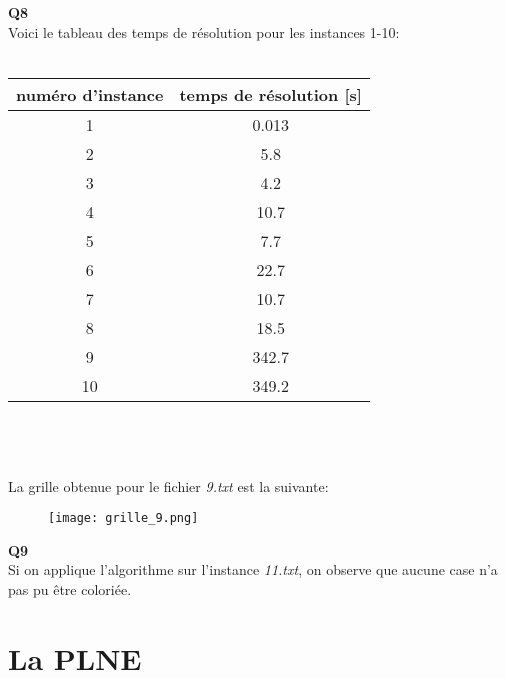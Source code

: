 \documentclass[10pt,a4paper]{article}
\begin{document}
\noindent 
\textbf{Q8}
\\
\noindent
Voici le tableau des temps de résolution pour les instances 1-10: \\ \\
\begin{tabular}{|c|c|}
\hline
numéro d'instance & temps de résolution [s]\\
\hline
\hline
1  & 0.013\\
\hline
2 & 5.8\\
\hline
3 & 4.2\\
\hline
4 & 10.7\\
\hline
5 & 7.7\\
\hline
6 & 22.7\\
\hline
7 & 10.7\\
\hline
8 & 18.5\\
\hline
9 & 342.7\\
\hline
10 & 349.2\\
\hline
\end{tabular} 
\\ \\ \\
\noindent
La grille obtenue pour le fichier \textit{9.txt} est la suivante:

\begin{figure}[H]
\texttt{[image: grille\_9.png]}
\end{figure} 
\noindent
\textbf{Q9} \\
\noindent
Si on applique l'algorithme sur l'instance \textit{11.txt}, on observe que aucune case n'a pas pu être coloriée. 
\newpage
\section{La PLNE}
\end{document}

